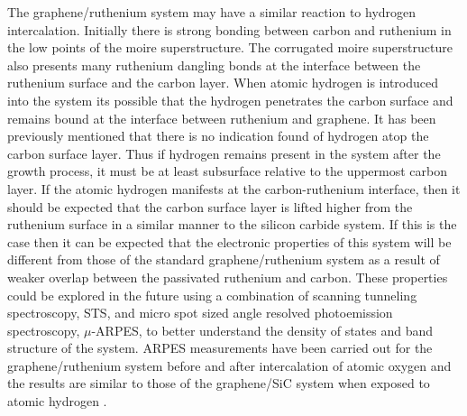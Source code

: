 The graphene/ruthenium system may have a similar reaction to hydrogen intercalation. Initially there is strong bonding between carbon and ruthenium in the low points of the moire superstructure. The corrugated moire superstructure also presents many ruthenium dangling bonds at the interface between the ruthenium surface and the carbon layer. When atomic hydrogen is introduced into the system its possible that the hydrogen penetrates the carbon surface and remains bound at the interface between ruthenium and graphene. It has been previously mentioned that there is no indication found of hydrogen atop the carbon surface layer. Thus if hydrogen remains present in the system after the growth process, it must be at least subsurface relative to the uppermost carbon layer. If the atomic hydrogen manifests at the carbon-ruthenium interface, then it should be expected that the carbon surface layer is lifted higher from the ruthenium surface in a similar manner to the silicon carbide system. If this is the case then it can be expected that the electronic properties of this system will be different from those of the standard graphene/ruthenium system as a result of weaker overlap between the passivated ruthenium and carbon. These properties could be explored in the future using a combination of scanning tunneling spectroscopy, STS, and micro spot sized angle resolved photoemission spectroscopy, $\mu$-ARPES, to better understand the density of states and band structure of the system. ARPES measurements have been carried out for the graphene/ruthenium system before and after intercalation of atomic oxygen and the results are similar to those of the graphene/SiC system when exposed to atomic hydrogen \cite{o2-intercalation}. 




